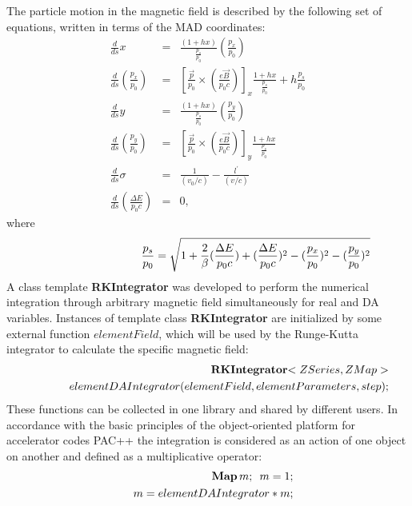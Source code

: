 The particle motion in the magnetic field is described by the following 
set of equations, written in terms of the MAD coordinates:  \\
\begin{eqnarray} \label{eq:motion}
\frac{d}{ds}x & = &
\frac{(1+hx)}{\frac{p_s}{p_0}}\left (\frac{p_x}{p_0}\right) 
\nonumber \\ 
\frac{d}{ds} \left (\frac{p_x}{p_0} \right ) & = & \left 
[\frac{\vec{p}}{p_0}\times \left (\frac{e\vec{B}}{p_0  c}\right ) 
	  \right ]_x \frac{1+hx}{\frac{p_s}{p_0}} + h\frac{p_s}{p_0}
\nonumber \\ 
\frac{d}{ds}y & = &
	  \frac{(1+hx)}{\frac{p_s}{p_0}}\left (\frac{p_y}{p_0}\right ) \\ 
\frac{d}{ds} \left (\frac{p_y}{p_0} \right ) & = & \left 
	  [\frac{\vec{p}}{p_0}\times \left (\frac{e\vec{B}}{p_0 c}\right ) 
	  \right ]_y \frac{1+hx}{\frac{p_s}{p_0}} 
\nonumber \\
\frac{d}{ds} 
	  \sigma & = & \frac{1}{(v_0/c)} - \frac{l^{'}}{(v/c)}
\nonumber \\ 
\frac{d}{ds} \left (\frac{\Delta E}{p_0 c} \right ) & = & 0, 
\nonumber 
\end{eqnarray}
where 
\begin{eqnarray*}
\hspace{3.0 cm}
\frac{p_s}{p_0}  =  \sqrt{1+\frac{2}{\beta}(\frac{\Delta{E}}{p_0c}) 
+(\frac{\Delta{E}}{p_0c})^2 - (\frac{p_x}{p_0})^2 - (\frac{p_y}{p_0})^2 } \\ 
\end{eqnarray*}
A class template {\bf RKIntegrator} was developed
to perform the numerical integration through arbitrary magnetic field
simultaneously for real and DA variables. Instances of template class {\bf RKIntegrator} are 
initialized by some external function $elementField$, which will be used by 
the Runge-Kutta integrator to calculate the specific magnetic field:
\begin{eqnarray*}
& & {\bf RKIntegrator}{<ZSeries, ZMap>}       \\
& & \hspace{1. cm} elementDAIntegrator(elementField, elementParameters,step);
\end{eqnarray*}
These functions can be collected in one library and shared by different users. 
In accordance with the basic principles of the object-oriented platform for 
accelerator codes PAC++\cite{PAC}
the integration is considered as an action of one object on another and defined 
as a multiplicative operator:
\begin{eqnarray*}
& & {\bf Map} \, m; \, \,\, m = 1; \\
& & m = elementDAIntegrator*m;              
\end{eqnarray*}

